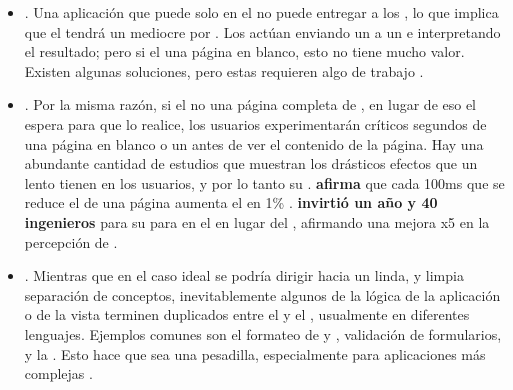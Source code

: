 \begin{itemize}
	\item
		\textbf{\seoINT}. Una aplicación que puede solo \runCPT en el \clientSideAS no puede entregar \htmlNAME a los \crawlersINT, lo que implica que el \webINT tendrá un \seoINT mediocre por . Los \crawlersINT actúan enviando un \requestINT a un \webserverINT e interpretando el resultado; pero si el \serverAS \responseINT una página en blanco, esto no tiene mucho valor. Existen algunas soluciones, pero estas requieren algo de trabajo \cite{online_problems_sing_page_app}.
	\item
		\textbf{\performanceQA}. Por la misma razón, si el \serverAS no \renderCPT una página completa de \htmlNAME, en lugar de eso el \clientSideAS espera para que \javaScriptNAME lo realice, los usuarios experimentarán críticos segundos de una página en blanco o un \loadingSpinnerCPT antes de ver el contenido de la página. Hay una abundante cantidad de estudios que muestran los drásticos efectos que un \siteINT lento tienen en los usuarios, y por lo tanto su \revenueQA \cite{online_fastView_web_perfor_opti_accele}. \textbf{\amazonNAME afirma} que cada 100ms que se reduce el \loadTimeCPT de una página aumenta el \revenueQA en 1\% \cite{kohavi2007online} \cite{online_psychology_web_performance}.\textbf{ \twitterNAME invirtió un año y 40 ingenieros} para \rebuildingPL su \siteINT para \renderCPT en el \serverAS en lugar del \clientAS, afirmando una mejora x5 en la percepción de \loadingTimeCPT \cite{online_improving_web_performance_twitter}.
	\item
		\textbf{\maintainabilityQA}. Mientras que en el caso ideal se podría dirigir hacia un linda, y limpia separación de conceptos, inevitablemente algunos \bitsPC de la lógica de la aplicación o de la vista terminen duplicados entre el \clientAS y el \serverAS, usualmente en diferentes lenguajes. Ejemplos comunes son el formateo de  \datePL y \currencyCPT, validación de formularios, y la \routingLogicAS. Esto hace que \maintenanceQA sea una pesadilla, especialmente para aplicaciones más complejas \cite{online_problems_sing_page_app}.

\end{itemize}
